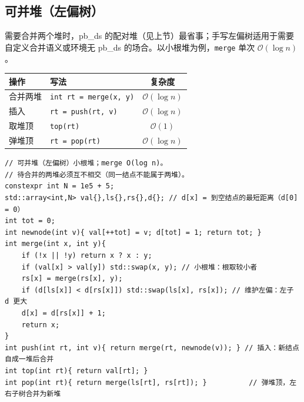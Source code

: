 \subsection{可并堆（左偏树）}

需要合并两个堆时，pb\_ds 的配对堆（见上节）最省事；手写左偏树适用于需要自定义合并语义或环境无 pb\_ds 的场合。以小根堆为例，\texttt{merge} 单次 $\mathcal{O}(\log n)$。

\begin{center}
\small
\begin{tabular}{lp{7cm}c}
\toprule
操作 & 写法 & 复杂度 \\
\midrule
合并两堆 & \texttt{int rt = merge(x, y)} & $\mathcal{O}(\log n)$ \\
插入 & \texttt{rt = push(rt, v)} & $\mathcal{O}(\log n)$ \\
取堆顶 & \texttt{top(rt)} & $\mathcal{O}(1)$ \\
弹堆顶 & \texttt{rt = pop(rt)} & $\mathcal{O}(\log n)$ \\
\bottomrule
\end{tabular}
\end{center}

\begin{lstlisting}
// 可并堆（左偏树）小根堆；merge O(log n)。
// 待合并的两堆必须互不相交（同一结点不能属于两堆）。
constexpr int N = 1e5 + 5;
std::array<int,N> val{},ls{},rs{},d{}; // d[x] = 到空结点的最短距离（d[0] = 0）
int tot = 0;
int newnode(int v){ val[++tot] = v; d[tot] = 1; return tot; }
int merge(int x, int y){
    if (!x || !y) return x ? x : y;
    if (val[x] > val[y]) std::swap(x, y); // 小根堆：根取较小者
    rs[x] = merge(rs[x], y);
    if (d[ls[x]] < d[rs[x]]) std::swap(ls[x], rs[x]); // 维护左偏：左子 d 更大
    d[x] = d[rs[x]] + 1;
    return x;
}
int push(int rt, int v){ return merge(rt, newnode(v)); } // 插入：新结点自成一堆后合并
int top(int rt){ return val[rt]; }
int pop(int rt){ return merge(ls[rt], rs[rt]); }          // 弹堆顶，左右子树合并为新堆
\end{lstlisting}
